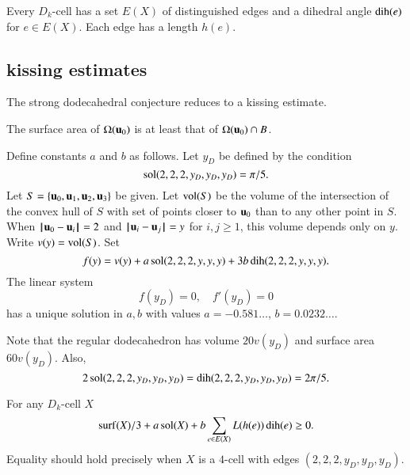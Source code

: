 Every $D_k$-cell has a set $E(X)$ of distinguished edges and a dihedral angle $\operatorname{dih}(e)$ for $e\in E(X)$.  Each edge has a length $h(e)$.
%
%
%
%

\subsection{kissing estimates}

The strong dodecahedral conjecture reduces to a kissing estimate.
%

\begin{lemma} The surface area of $\Omega( {\mathbf u}_0)$ is at least that
of $\Omega( {\mathbf u}_0)\cap B$.
\end{lemma}
%
%

\begin{definition}
Define constants $a$ and $b$ as follows.  Let $y_D$ be defined
by the condition
$$
\operatorname{sol}(2,2,2,y_D,y_D,y_D) = \pi/5.
$$
Let $S=\{ {\mathbf u}_0, {\mathbf u}_1, {\mathbf u}_2, {\mathbf u}_3\}$ be given.  Let ${\operatorname{vol}}(S)$ be the
volume of the intersection of the convex hull of $S$ with set of points closer to $ {\mathbf u}_0$ than to any other point in $S$.  When ${\hskip0.1em|\hskip-0.15em|\hskip0.1em} {\mathbf u}_0 -  {\mathbf u}_i{\hskip0.1em|\hskip-0.15em|\hskip0.1em} = 2$ and ${\hskip0.1em|\hskip-0.15em|\hskip0.1em} {\mathbf u}_i -  {\mathbf u}_j{\hskip0.1em|\hskip-0.15em|\hskip0.1em} = y$ for $i,j\ge 1$, this volume depends
only on $y$. Write $v(y) = {\operatorname{vol}}(S)$.  Set
$$
f(y) = v(y) + a \operatorname{sol}(2,2,2,y,y,y) + 3 b \operatorname{dih}(2,2,2,y,y,y).
$$
The linear system
$$
f(y_D) = 0,\quad f'(y_D) = 0
$$
has a unique solution in $a,b$ with values $a=-0.581\ldots$, $b=0.0232\ldots$.
\end{definition}
%
%
%
%
%

Note that the regular dodecahedron has volume $20 v(y_D)$ and surface area $60 v(y_D)$.  Also,
$$
2\operatorname{sol}(2,2,2,y_D,y_D,y_D) =\operatorname{dih}(2,2,2,y_D,y_D,y_D)=2\pi/5.
$$
%
%

\begin{conjecture}  For any $D_k$-cell $X$
$$
{\operatorname{surf}}(X)/3 + a \operatorname{sol}(X) + b \sum_{e\in E(X)} L(h(e)) \operatorname{dih}(e) \ge 0.
$$
Equality should hold precisely when $X$ is a $4$-cell with edges
$(2,2,2,y_D,y_D,y_D)$.
\end{conjecture}
%

